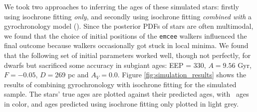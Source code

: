 We took two approaches to inferring the ages of these simulated stars:
firstly using isochrone fitting {\it only}, and secondly using isochrone
fitting {\it combined with} a gyrochronology model (\sd).
Since the posterior PDFs of stars are often multimodal, we found that the
choice of initial positions of the {\tt emcee} walkers influenced the final
outcome because walkers occasionally got stuck in local minima.
We found that the following set of initial parameters worked well, though not
perfectly, for dwarfs but sacrificed some accuracy in subgiant ages: EEP =
330, $A = 9.56$ Gyr, $F = -0.05$, $D = 269$ pc and $A_V = 0.0$.
Figure \ref{fig:simulation_results} shows the results of combining
gyrochronology with isochrone fitting for the simulated sample.
The stars' true ages are plotted against their predicted ages, with \sd\ ages
in color, and ages predicted using isochrone fitting only plotted in light
grey.
